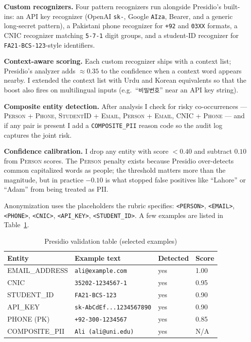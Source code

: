 \documentclass[conference]{IEEEtran}
\begin{document}
\textbf{Custom recognizers.} Four pattern recognizers run alongside
Presidio's built-ins: an API key recognizer (OpenAI \texttt{sk-},
Google \texttt{AIza}, Bearer, and a generic long-secret pattern), a
Pakistani phone recognizer for \texttt{+92} and \texttt{03XX} formats, a
CNIC recognizer matching \texttt{5-7-1} digit groups, and a student-ID
recognizer for \texttt{FA21-BCS-123}-style identifiers.

\textbf{Context-aware scoring.} Each custom recognizer ships with a
context list; Presidio's analyzer adds $\approx 0.35$ to the confidence
when a context word appears nearby. I extended the context list with
Urdu and Korean equivalents so that the boost also fires on multilingual
inputs (e.g.~``\texttt{비밀번호}'' near an API key string).

\textbf{Composite entity detection.} After analysis I check for risky
co-occurrences --- \textsc{Person + Phone}, \textsc{StudentID + Email},
\textsc{Person + Email}, \textsc{CNIC + Phone} --- and if any pair is
present I add a \texttt{COMPOSITE\_PII} reason code so the audit log
captures the joint risk.

\textbf{Confidence calibration.} I drop any entity with score $< 0.40$
and subtract $0.10$ from \textsc{Person} scores. The \textsc{Person}
penalty exists because Presidio over-detects common capitalized words
as people; the threshold matters more than the magnitude, but in
practice $-0.10$ is what stopped false positives like ``Lahore'' or
``Adam'' from being treated as PII.

Anonymization uses the placeholders the rubric specifies:
\texttt{<PERSON>}, \texttt{<EMAIL>}, \texttt{<PHONE>}, \texttt{<CNIC>},
\texttt{<API\_KEY>}, \texttt{<STUDENT\_ID>}. A few examples are listed
in Table~\ref{tab:presidio}.

\begin{table}[t]
\caption{Presidio validation table (selected examples)}
\label{tab:presidio}
\centering
\footnotesize
\begin{tabular}{p{1.4cm}p{2.3cm}p{1.2cm}p{1.0cm}}
\toprule
\textbf{Entity} & \textbf{Example text} & \textbf{Detected} & \textbf{Score} \\
\midrule
EMAIL\_ADDRESS & \texttt{ali@example.com}     & yes & 1.00 \\
CNIC           & \texttt{35202-1234567-1}     & yes & 0.95 \\
STUDENT\_ID    & \texttt{FA21-BCS-123}        & yes & 0.90 \\
API\_KEY       & \texttt{sk-AbCdEf...1234567890} & yes & 0.90 \\
PHONE (PK)     & \texttt{+92-300-1234567}     & yes & 0.85 \\
COMPOSITE\_PII & \texttt{Ali (ali@uni.edu)}   & yes & N/A  \\
\bottomrule
\end{tabular}
\end{table}
\end{document}
